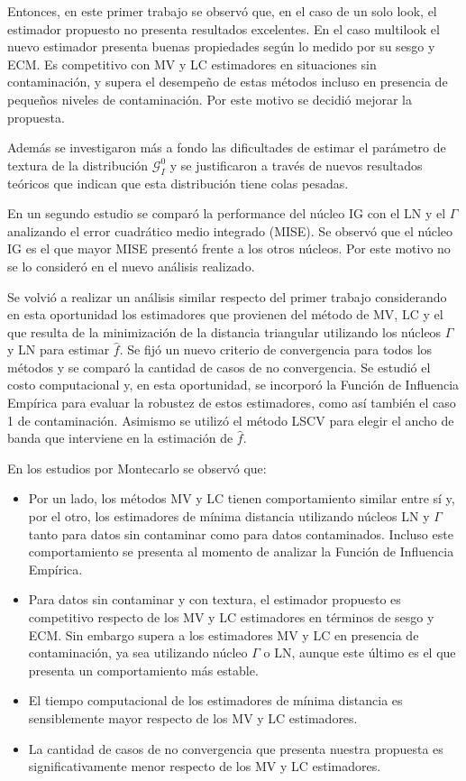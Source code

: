 Entonces, en este primer trabajo se observó que, en el caso de un solo look, el estimador propuesto no presenta resultados excelentes. En el caso multilook el nuevo estimador presenta buenas propiedades según lo medido
por su sesgo y ECM. Es competitivo con MV y LC estimadores en situaciones sin contaminación, y supera el desempeño de estas métodos incluso en presencia de pequeños niveles de contaminación. Por este motivo se decidió mejorar la propuesta. 

Además se investigaron más a fondo las dificultades de estimar el parámetro de textura de la distribución $\mathcal{G}_I^0$  y se justificaron a través de nuevos resultados teóricos que indican que esta distribución tiene colas pesadas.

En un segundo estudio se comparó la performance del núcleo IG con el LN y el $\Gamma$ analizando el error cuadrático medio integrado (MISE). Se observó que el núcleo IG es el que mayor MISE presentó frente a los otros núcleos. Por este motivo no se lo consideró en el nuevo análisis realizado.

Se volvió a realizar un análisis similar respecto del primer trabajo considerando en esta oportunidad los estimadores que provienen del método de MV, LC y el que resulta de la minimización de la distancia triangular utilizando los núcleos $\Gamma$ y LN para estimar $\widehat{f}$. Se fijó un nuevo criterio de convergencia para todos los métodos y se comparó la cantidad de casos de no convergencia. Se estudió el costo computacional y, en esta oportunidad, se incorporó la Función de Influencia Empírica para evaluar la robustez de estos estimadores, como así también el caso 1 de contaminación. Asimismo se utilizó el método LSCV para elegir el ancho de banda que interviene en la estimación de $\widehat{f}$. 

En los estudios por Montecarlo se observó que:

\begin{itemize}
	\item Por un lado, los métodos MV y LC tienen comportamiento similar entre sí y, por el otro, los estimadores de mínima distancia utilizando núcleos LN y $\Gamma$ tanto para datos sin contaminar como para datos contaminados. Incluso este comportamiento se presenta al momento de analizar la Función de Influencia Empírica.
	\item Para datos sin contaminar y con textura, el estimador propuesto es competitivo respecto de los MV y LC estimadores en términos de sesgo y ECM. Sin embargo supera a los estimadores MV y LC en presencia de contaminación, ya sea utilizando núcleo $\Gamma$ o LN, aunque este último es el que presenta un comportamiento más estable.
	\item El tiempo computacional de los estimadores de mínima distancia es sensiblemente mayor respecto de los MV y LC estimadores.
	\item La cantidad de casos de no convergencia que presenta nuestra propuesta es significativamente menor respecto de los MV y LC estimadores.
\end{itemize}

